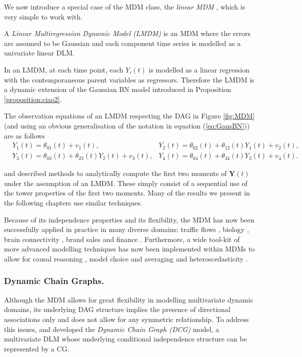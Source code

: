 We now introduce a special case of the MDM class, the \textit{linear MDM} \citep{Queen1993}, which is very simple to work with. 

\begin{definition}
A \emph{Linear Multiregression Dynamic Model (LMDM)} is an MDM where the errors are assumed to be Gaussian and each component time series is modelled as a univariate linear DLM.
\end{definition}
In an LMDM, at each time point, each $Y_i(t)$ is modelled as a linear regression with the contemporaneous parent variables as regressors. Therefore the LMDM is a dynamic extension of the Gaussian BN model introduced in Proposition \ref{proposition:ciao2}. 

\begin{example}
The observation equations of an LMDM respecting the DAG in Figure \ref{fig:MDM} (and using an obvious generalisation of the notation in equation (\ref{eq:GausBN})) are as follows
\begin{align}
&Y_1(t)=\theta_{01}(t)+v_1(t), &Y_2(t)=\theta_{02}(t)+\theta_{12}(t)Y_1(t)+v_2(t),\nonumber\\
&Y_3(t)=\theta_{03}(t)+\theta_{23}(t)Y_2(t)+v_3(t),&Y_4(t)=\theta_{04}(t)+\theta_{34}(t)Y_3(t)+v_4(t).\nonumber
\end{align}
\end{example}
\citet{Queen1993} and \citet{Queen2008} described methods to analytically compute the first two moments of $\bm{Y}(t)$ under the assumption of an LMDM. These simply consist of a sequential use of the tower properties of the first two moments. Many of the results we present in the following chapters use similar techniques.

Because of its independence properties and its flexibility, the MDM has now been successfully applied in practice in many diverse domains: traffic flows \citep{Anacleto2013}, biology \citep{Oates2013}, brain connectivity \citep{Costa2015}, brand sales \citep{Queen1994} and finance \citep{Zhao2015}. Furthermore, a wide tool-kit of more advanced modelling techniques has now been implemented within MDMs to allow for causal reasoning \citep{Queen2009}, model choice and averaging \citep{Costa2015,Zhao2015} and heteroscedasticity \citep{Anacleto2013}. 

\subsubsection{Dynamic Chain Graphs.}
\label{sec:DCG}
Although the MDM allows for great flexibility in modelling multivariate dynamic domains, its underlying DAG structure implies the presence of directional associations only and does not allow for any symmetric relationship. To address this issues, \citet{Queen1992} and \citet{Anacleto2013c} developed the \textit{Dynamic Chain Graph (DCG)} model, a multivariate DLM whose underlying conditional independence structure can be represented by a CG. 

